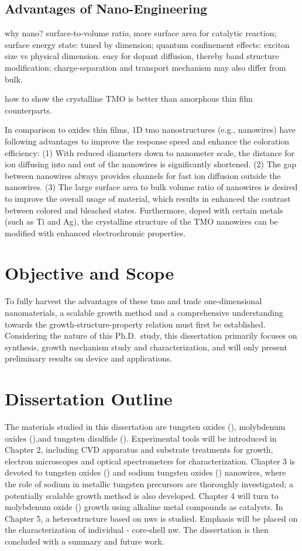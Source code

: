 \subsection{Advantages of Nano-Engineering}

why nano? surface-to-volume ratio, more surface area for catalytic reaction; surface energy state: tuned by dimension; quantum confinement effects: exciton size vs physical dimension. easy for dopant diffusion, thereby band structure modification; charge-separation and transport mechanism may also differ from bulk.

how to show the crystalline TMO is better than amorphous thin film counterparts.

In comparison to oxides thin films, 1D \gls{tmo} nanostructures (e.g., nanowires) have following advantages to improve the response speed and enhance the coloration efficiency: (1) With reduced diameters down to nanometer scale, the distance for ion diffusing into and out of the nanowires is significantly shortened. (2) The gap between nanowires always provides channels for fast ion diffusion outside the nanowires. (3) The large surface area to bulk volume ratio of nanowires is desired to improve the overall usage of material, which results in enhanced the contrast between colored and bleached states. Furthermore, doped with certain metals (such as Ti and Ag), the crystalline structure of the TMO nanowires can be modified with enhanced electrochromic properties.\cite{Xiong2008} 

\section{Objective and Scope}
To fully harvest the advantages of these \gls{tmo} and \gls{tmdc} one-dimensional nanomaterials, a scalable growth method and a comprehensive understanding towards the growth-structure-property relation must first be established. Considering the nature of this Ph.D.\ study, this dissertation primarily focuses on synthesis, growth mechanism study and characterization, and will only present preliminary results on device and applications.

\section{Dissertation Outline}
The materials studied in this dissertation are tungsten oxides (), molybdenum oxides (),and tungsten disulfide (). Experimental tools will be introduced in Chapter 2, including CVD apparatus and substrate treatments for growth, electron microscopes and optical spectrometers for characterization. Chapter 3 is devoted to tungsten oxides () and sodium tungsten oxides () nanowires, where the role of sodium in metallic tungsten precursors are thoroughly investigated; a potentially scalable growth method is also developed. Chapter 4 will turn to molybdenum oxide () growth using alkaline metal compounds as catalysts. In Chapter 5, a heterostructure based on  \glspl{nw} is studied. Emphasis will be placed on the characterization of individual - core-shell \gls{nw}. The dissertation is then concluded with a summary and future work. 

